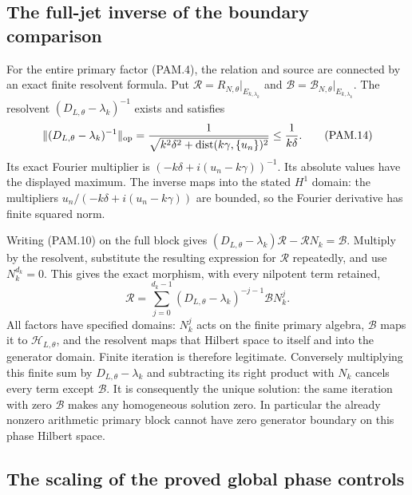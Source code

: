 \subsection{The full-jet inverse of the boundary comparison}

For the entire primary factor (PAM.4), the relation and source are
connected by an exact finite resolvent formula. Put
\(\mathcal R=R_{N,\theta}|_{E_{k,\lambda_k}}\) and
\(\mathcal B=\mathscr B_{N,\theta}|_{E_{k,\lambda_k}}\).
The resolvent \((D_{L,\theta}-\lambda_k)^{-1}\) exists and satisfies
\[
 \|(D_{L,\theta}-\lambda_k)^{-1}\|_{\rm op}
 =\frac1{\sqrt{k^2\delta^2+
                 \operatorname{dist}(k\gamma,\{u_n\})^2}}
 \le\frac1{k\delta}.
 \tag{PAM.14}\label{CFStage:eq:pam-resolvent}
\]
Its exact Fourier multiplier is
\((-k\delta+i(u_n-k\gamma))^{-1}\). Its absolute values have the
displayed maximum. The inverse maps into the stated \(H^1\) domain:
the multipliers \(u_n/(-k\delta+i(u_n-k\gamma))\) are bounded,
so the Fourier derivative has finite squared norm.

Writing (PAM.10) on the full block gives
\((D_{L,\theta}-\lambda_k)\mathcal R-\mathcal R N_k=\mathcal B\).
Multiply by the resolvent, substitute the resulting expression
for \(\mathcal R\) repeatedly, and use \(N_k^{d_k}=0\). This gives
the exact morphism, with every nilpotent term retained,
\[
 \boxed{\quad
 \mathcal R
 =\sum_{j=0}^{d_k-1}
       (D_{L,\theta}-\lambda_k)^{-j-1}\mathcal B N_k^j .
 \quad}
 \tag{PAM.15}\label{CFStage:eq:pam-sylvester}
\]
All factors have specified domains: \(N_k^j\) acts on the finite
primary algebra, \(\mathcal B\) maps it to \(\mathcal H_{L,\theta}\),
and the resolvent maps that Hilbert space to itself and into the
generator domain. Finite iteration is therefore legitimate.
Conversely multiplying this finite sum by
\(D_{L,\theta}-\lambda_k\) and subtracting its right product with
\(N_k\) cancels every term except \(\mathcal B\).
It is consequently the unique solution: the same iteration with
zero \(\mathcal B\) makes any homogeneous solution zero.
In particular the already nonzero arithmetic primary block cannot
have zero generator boundary on this phase Hilbert space.

\subsection{The scaling of the proved global phase controls}

